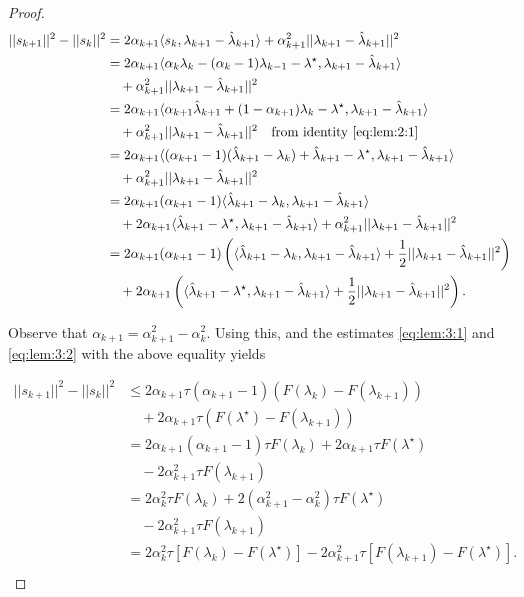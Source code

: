 \documentclass[11pt]{article}
\newcommand{\inner}[2]{\langle #1, #2\rangle}
\begin{document}
\begin{proof}
\begin{align*}
||s_{k+1}||^2 - ||s_k||^2 &=  2\alpha_{k+1}\inner{s_k}{\lambda_{k+1} - \hat\lambda_{k+1}} + \alpha_{k+1}^2||\lambda_{k+1} - \hat\lambda_{k+1}||^2 \\
&= 2\alpha_{k+1}\inner{\alpha_k\lambda_k - (\alpha_k - 1)\lambda_{k-1} - \lambda^\star}{\lambda_{k+1} - \hat\lambda_{k+1}} \\
&\quad + \alpha_{k+1}^2||\lambda_{k+1} - \hat\lambda_{k+1}||^2 \\
&= 2\alpha_{k+1}\inner{\alpha_{k+1}\hat\lambda_{k+1} + (1 - \alpha_{k+1})\lambda_k - \lambda^\star}{\lambda_{k+1} - \hat\lambda_{k+1}} \\
&\quad + \alpha_{k+1}^2||\lambda_{k+1} - \hat\lambda_{k+1}||^2 \quad\text{from identity \cref{eq:lem:2:1}}\\ 
&= 2\alpha_{k+1}\inner{(\alpha_{k+1} - 1)(\hat\lambda_{k+1} - \lambda_k) + \hat\lambda_{k+1} - \lambda^\star}{\lambda_{k+1} - \hat\lambda_{k+1}} \\
&\quad + \alpha_{k+1}^2||\lambda_{k+1} - \hat\lambda_{k+1}||^2 \\
&= 2\alpha_{k+1}(\alpha_{k+1} - 1)\inner{\hat\lambda_{k+1} - \lambda_k}{\lambda_{k+1} - \hat\lambda_{k+1}} \\
&\quad + 2\alpha_{k+1}\inner{\hat\lambda_{k+1} - \lambda^\star}{\lambda_{k+1} - \hat\lambda_{k+1}} + \alpha_{k+1}^2||\lambda_{k+1} - \hat\lambda_{k+1}||^2 \\
&= 2\alpha_{k+1}(\alpha_{k+1} - 1)\left(\inner{\hat\lambda_{k+1} - \lambda_k}{\lambda_{k+1} - \hat\lambda_{k+1}} + \frac 12 ||\lambda_{k+1} - \hat\lambda_{k+1}||^2\right) \\
&\quad + 2\alpha_{k+1}\left(\inner{\hat\lambda_{k+1} - \lambda^\star}{\lambda_{k+1} - \hat\lambda_{k+1}} + \frac 12 ||\lambda_{k+1} - \hat\lambda_{k+1}||^2\right). \\
\end{align*}

\noindent Observe that $\alpha_{k+1} = \alpha_{k+1}^2 - \alpha_k^2$.  Using this, and the estimates \cref{eq:lem:3:1} and \cref{eq:lem:3:2} with the above equality yields

\begin{align*}
||s_{k+1}||^2 - ||s_k||^2 &\le 2\alpha_{k+1}\tau(\alpha_{k+1} - 1)(F(\lambda_k) - F(\lambda_{k+1})) \\
&\quad + 2\alpha_{k+1}\tau(F(\lambda^\star) - F(\lambda_{k+1})) \\
&= 2\alpha_{k+1}(\alpha_{k+1} - 1)\tau F(\lambda_k) + 2\alpha_{k+1}\tau F(\lambda^\star) \\
&\quad - 2\alpha_{k+1}^2\tau F(\lambda_{k+1})\\
&= 2\alpha_k^2\tau F(\lambda_k) + 2\left(\alpha_{k+1}^2-\alpha_k^2\right)\tau F(\lambda^\star) \\
&\quad - 2\alpha_{k+1}^2\tau F(\lambda_{k+1})\\
&= 2\alpha_k^2\tau\left[F(\lambda_k) - F(\lambda^\star)\right] - 2\alpha_{k+1}^2\tau\left[F(\lambda_{k+1}) - F(\lambda^\star)\right].\\
\end{align*}

\end{proof}
\end{document}

